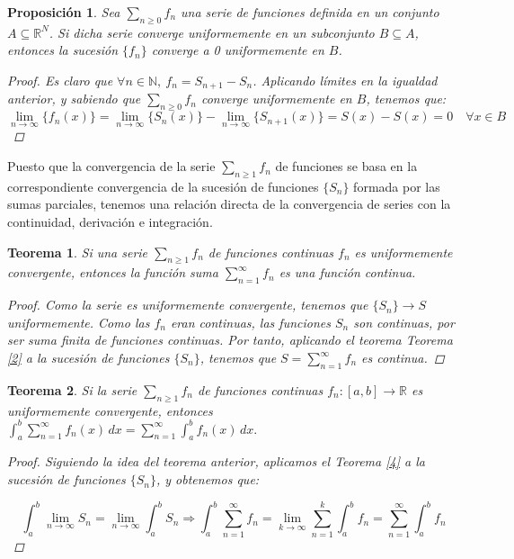 \documentclass[11pt, a4paper]{article}
\newcommand{\N}{\mathbb{N}}
\newcommand{\fn}{\{f_n\}}
\theoremstyle{theorem-style}
\newtheorem{nth}{Teorema}[section]
\newtheorem{nprop}{Proposición}[section]
\theoremstyle{definition-style}
\theoremstyle{remark-style}
\theoremstyle{example-style}
\begin{document}
\begin{nprop}
  Sea $\sum_{n \ge 0} f_n$ una serie de funciones definida en un conjunto $A \subseteq \mathbb{R}^N$. Si dicha serie converge uniformemente en un subconjunto $B \subseteq A$, entonces la sucesión $\fn$ converge a 0 uniformemente en $B$.
  
  \begin{proof}
    Es claro que $\forall n \in \N,\ f_n = S_{n+1} - S_n$. Aplicando límites en la igualdad anterior, y sabiendo que $\sum_{n\ge 0} f_n$ converge uniformemente en $B$, tenemos que: 
    $$\lim_{n \to \infty} \{f_n(x)\} = \lim_{n \to \infty} \{S_n(x)\} - \lim_{n \to \infty} \{S_{n + 1}(x)\} = S(x) - S(x) = 0\quad \forall x \in B$$
  \end{proof}
\end{nprop}

Puesto que  la convergencia de la serie $\sum_{n\geq 1} f_n$ de funciones se basa en la correspondiente convergencia de la sucesi\'on de funciones $\{S_n\}$ formada por las sumas parciales, tenemos una relación directa de la convergencia de series con la continuidad, derivación e integración.


\begin{nth} \label{7}
  Si una serie  $\sum_{n\geq 1} f_n $ de funciones continuas $f_n$ es uniformemente convergente, entonces la funci\'on suma $\displaystyle \sum_{n=1}^{\infty} f_n $ es una funci\'on continua.

  \begin{proof}
    Como la serie es uniformemente convergente, tenemos que $\{S_n\} \to S$ uniformemente. Como las $f_n$ eran continuas, las funciones $S_n$ son continuas, por ser suma finita de funciones continuas. Por tanto, aplicando el teorema \textit{Teorema \ref{2}} a la sucesión de funciones $\{S_n\}$, tenemos que $S = \sum_{n=1}^{\infty} f_n$ es continua.
  \end{proof}
\end{nth}


\begin{nth} \label{8}
  Si la serie $\sum_{n\geq 1} f_n $ de funciones continuas $f_n:[a,b]\longrightarrow \mathbb R$ es uniformemente convergente, entonces 
  $
  \displaystyle \int_a^b \sum_{n=1}^{\infty} f_n (x) \, dx =  \sum_{n=1}^{\infty} \int_a^b f_n (x) \, dx  .
  $

  \begin{proof}
    Siguiendo la idea del teorema anterior, aplicamos el \textit{Teorema \ref{4}} a la sucesión de funciones $\{S_n\}$, y obtenemos que:

    $$\int_a^b \lim_{n \to \infty} S_n = \lim_{n \to \infty} \int_a^b S_n \Rightarrow \int_a^b \sum_{n=1}^{\infty} f_n = \lim_{k \to \infty} \sum_{n=1}^k \int_a^b f_n = \sum_{n =1}^{\infty} \int_a^b f_n$$
  \end{proof}
\end{nth}
\end{document}
